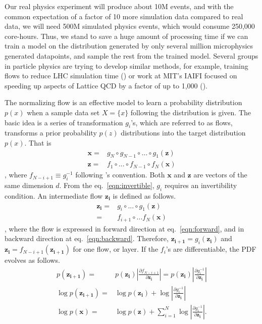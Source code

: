 Our real physics experiment will produce about 10M events, and with the common expectation of a factor of 10 more simulation data compared to real data, we will need 500M simulated physics events, which would consume 250,000 core-hours. Thus, we stand to save a huge amount of processing time if we can train a model on the distribution generated by only several million microphysics generated datapoints, and sample the rest from the trained model. Several groups in particle physics are trying to develop similar methods, for example, training flows to reduce LHC simulation time (\citet{stan}) or work at MIT's IAIFI focused on speeding up aspects of Lattice QCD by a factor of up to 1,000 (\citet{phialia}).


The normalizing flow is an effective model to learn a probability distribution $p(x)$ when a sample data set $X=\{x\}$ following the distribution is given. The basic idea is a series of transformation $g_i$'s, which are referred to as flows, transforms a prior probability $p(z)$ distributions into the target distribution $p(x)$. That is
\begin{align}
    \mathbf{x} =& g_N \circ g_{N-1}\circ ... \circ g_1 (\mathbf{z}) \\
    \mathbf{z} =& f_1 \circ ... \circ f_{N-1} \circ f_N (\mathbf{x}) \label{eqn:invertible}
\end{align}
, where $f_{N-i+1}\equiv g_i^{-1}$ following \citet{9089305}'s convention. Both $\mathbf{x}$ and $\mathbf{z}$ are vectors of the same dimension $d$. From the eq.~\ref{eqn:invertible}, $g_i$ requires an invertibility condition. An intermediate flow $\mathbf{z_i}$ is defined as follows.
\begin{align}
\mathbf{z_i} =&g_i \circ ... \circ g_1(\mathbf{z}) \label{eqn:forward}\\
    =&f_{i+1}\circ ...f_N(\mathbf{x}) \label{eqn:backward}
\end{align}
, where the flow is expressed in forward direction at eq.~\ref{eqn:forward}, and in backward direction at eq.~\ref{eqn:backward}. Therefore, $\mathbf{z_{i+1}}=g_i (\mathbf{z_i})$ and $\mathbf{z_i} = f_{N-i+1}(\mathbf{z_{i+1}})$ for one flow, or layer. If the $f_i$'s are differentiable, the PDF evolves as follows.
\begin{align}
 p(\mathbf{z_{i+1}})=& p(\mathbf{z_i})|\frac{\partial f_{N-i+1}}{\partial \mathbf{z_i}}| =p(\mathbf{z_i})|\frac{\partial g_{i}^{-1}}{\partial \mathbf{z_i}}|\\
 \log p(\mathbf{z_{i+1}}) =& \log p(\mathbf{z_i}) + \log|\frac{\partial g_i^{-1}}{\partial \mathbf{z_i}}| \label{eqn:logprob}\\
 \log p(\mathbf{x}) =& \log p(\mathbf{z}) + \sum\limits_{i=1}^N \log|\frac{\partial g_i^{-1}}{\partial \mathbf{z_i}}|.
\end{align}
